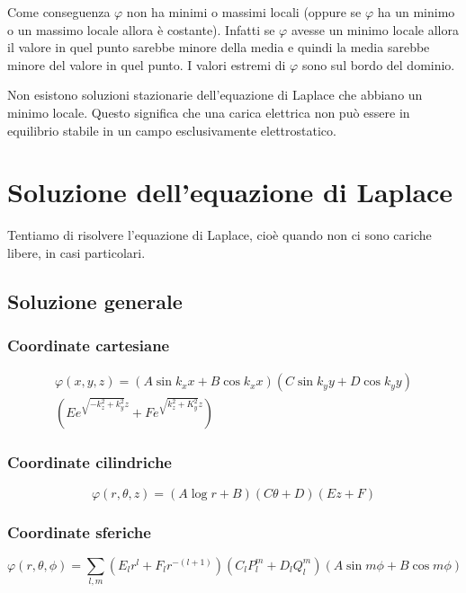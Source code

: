 Come conseguenza $\varphi$ non ha minimi o massimi locali (oppure se $\varphi$ ha un minimo o un massimo locale allora è costante). Infatti se $\varphi$ avesse un minimo locale allora il valore in quel punto sarebbe minore della media e quindi la media sarebbe minore del valore in quel punto. I valori estremi di $\varphi$ sono sul bordo del dominio.
\begin{Teo}[Earnshaw]
  Non esistono soluzioni stazionarie dell'equazione di Laplace che abbiano un minimo locale. Questo significa che una carica elettrica non può essere in equilibrio stabile in un campo esclusivamente elettrostatico.
\end{Teo}

\section{Soluzione dell'equazione di Laplace}
Tentiamo di risolvere l'equazione di Laplace, cioè quando non ci sono cariche libere, in casi particolari.
\subsection{Soluzione generale}
\subsubsection{Coordinate cartesiane}
\begin{multline}
  \varphi(x,y,z)=\left(A\sin k_x x+B\cos k_x x\right)\left(C\sin k_y y+D\cos k_y y\right)\\\left(Ee^{\sqrt{-k_z^2+k_y^2}z}+Fe^{\sqrt{k_z^2+K_y^2}z}\right)
\end{multline}
\subsubsection{Coordinate cilindriche}
\begin{equation}
  \varphi(r,\theta,z)=\left(A\log r+B\right)\left(C\theta+D\right)\left(Ez+F\right)
\end{equation}
\subsubsection{Coordinate sferiche}
\begin{equation}
  \varphi(r,\theta,\phi)=\sum_{l,m}\left(E_lr^l+F_lr^{-(l+1)}\right)\left(C_lP_l^m+D_lQ_l^m\right)\left(A\sin m\phi+B\cos m\phi\right)
\end{equation}

